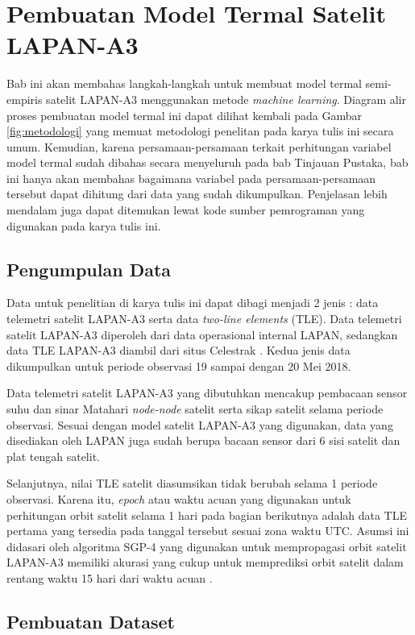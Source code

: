 \chapter{Pembuatan Model Termal Satelit LAPAN-A3}

Bab ini akan membahas langkah-langkah untuk membuat model termal semi-empiris
satelit LAPAN-A3 menggunakan metode \textit{machine learning}. Diagram alir
proses pembuatan model termal ini dapat dilihat kembali pada Gambar
\ref{fig:metodologi} yang memuat metodologi penelitan pada karya tulis ini
secara umum. Kemudian, karena persamaan-persamaan terkait perhitungan variabel
model termal sudah dibahas secara menyeluruh pada bab Tinjauan Pustaka, bab ini
hanya akan membahas bagaimana variabel pada persamaan-persamaan tersebut dapat
dihitung dari data yang sudah dikumpulkan. Penjelasan lebih mendalam juga dapat
ditemukan lewat kode sumber pemrograman yang digunakan pada karya tulis ini.

\section{Pengumpulan Data}

Data untuk penelitian di karya tulis ini dapat dibagi menjadi 2 jenis : data
telemetri satelit LAPAN-A3 serta data \textit{two-line elements} (TLE). Data
telemetri satelit LAPAN-A3 diperoleh dari data operasional internal LAPAN,
sedangkan data TLE LAPAN-A3 diambil dari situs Celestrak \cite{kelso}. Kedua
jenis data dikumpulkan untuk periode observasi 19 sampai dengan 20 Mei 2018.

Data telemetri satelit LAPAN-A3 yang dibutuhkan mencakup pembacaan sensor suhu
dan sinar Matahari \textit{node-node} satelit serta sikap satelit selama
periode observasi. Sesuai dengan model satelit LAPAN-A3 yang digunakan, data
yang disediakan oleh LAPAN juga sudah berupa bacaan sensor dari 6 sisi satelit
dan plat tengah satelit.

Selanjutnya, nilai TLE satelit diasumsikan tidak berubah selama 1 periode
observasi. Karena itu, \textit{epoch} atau waktu acuan yang digunakan untuk
perhitungan orbit satelit selama 1 hari pada bagian berikutnya adalah data TLE
pertama yang tersedia pada tanggal tersebut sesuai zona waktu UTC. Asumsi ini
didasari oleh algoritma SGP-4 yang digunakan untuk mempropagasi orbit satelit
LAPAN-A3 memiliki akurasi yang cukup untuk memprediksi orbit satelit dalam
rentang waktu 15 hari dari waktu acuan \cite{kelsoa}.

\section{Pembuatan Dataset}


